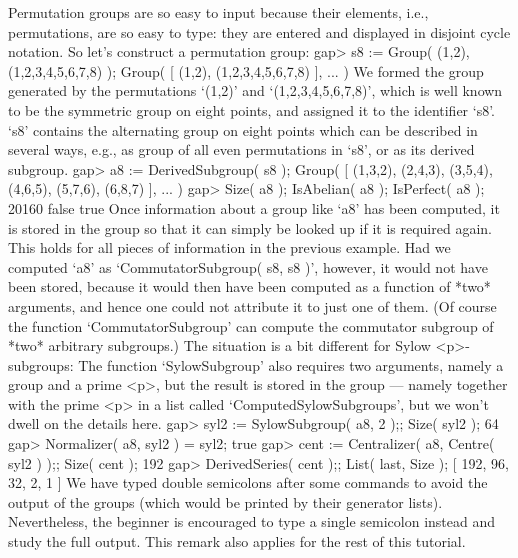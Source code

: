 Permutation  groups  are so easy to  input  because their elements, i.e.,
permutations,  are  so easy to  type: they  are  entered and displayed in
disjoint cycle notation. So let's construct a permutation group:
\beginexample
    gap> s8 := Group( (1,2), (1,2,3,4,5,6,7,8) );
    Group( [ (1,2), (1,2,3,4,5,6,7,8) ], ... )
\endexample
We  formed  the  group     generated by  the permutations    `(1,2)'  and
`(1,2,3,4,5,6,7,8)', which  is well known   to be the symmetric  group on
eight  points, and assigned it to  the identifier `s8'. `s8' contains the
alternating group on eight points which can be described in several ways,
e.g.,  as group  of all  even permutations  in  `s8',  or as its  derived
subgroup.
\beginexample
    gap> a8 := DerivedSubgroup( s8 );
    Group( [ (1,3,2), (2,4,3), (3,5,4), (4,6,5), (5,7,6), (6,8,7) ], ... )
    gap> Size( a8 ); IsAbelian( a8 ); IsPerfect( a8 );
    20160
    false
    true
\endexample
Once information about a group like `a8'  has been computed, it is stored
in the group so that it can simply be looked up  if it is required again.
This holds for all pieces of information  in the previous example. Had we
computed  `a8' as `CommutatorSubgroup(  s8, s8 )',  however, it would not
have been stored, because it would then  have been computed as a function
of *two* arguments, and hence one could  not attribute it  to just one of
them. (Of  course   the function  `CommutatorSubgroup'  can  compute  the
commutator subgroup of *two* arbitrary subgroups.) The situation is a bit
different for Sylow  <p>-subgroups:  The  function  `SylowSubgroup'  also
requires two arguments, namely a group and a prime <p>, but the result is
stored in the  group --- namely together  with  the prime  <p> in a  list
called `ComputedSylowSubgroups', but we won't dwell on the details here.
\beginexample
    gap> syl2 := SylowSubgroup( a8, 2 );; Size( syl2 );
    64
    gap> Normalizer( a8, syl2 ) = syl2;
    true
    gap> cent := Centralizer( a8, Centre( syl2 ) );; Size( cent );
    192
    gap> DerivedSeries( cent );; List( last, Size );
    [ 192, 96, 32, 2, 1 ]
\endexample
We have typed double semicolons  after some commands  to avoid the output
of the  groups   (which would  be  printed  by their  generator   lists).
Nevertheless, the beginner  is  encouraged to   type  a single  semicolon
instead and study the full output. This  remark also applies for the rest
of this tutorial.

